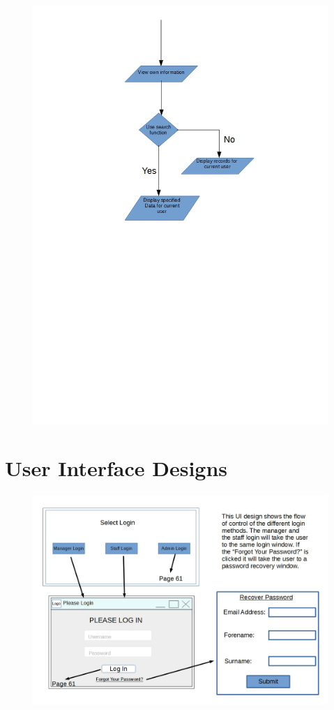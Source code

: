 \begin{figure}[H]
\includegraphics[width=\textwidth]{FlowchartPart5.jpg}
\end{figure}



\section{User Interface Designs}

\begin{figure}[H]
\includegraphics[width=\textwidth]{GUI_Design1.jpg}
\caption{}
\end{figure}

